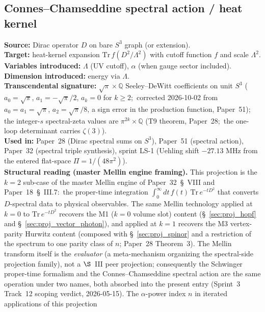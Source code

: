 \documentclass[11pt]{article}
\begin{document}
\subsection{Connes--Chamseddine spectral action / heat kernel}
\label{sec:proj_spectral_action}
\textbf{Source:} Dirac operator $D$ on bare $S^3$ graph (or
extension).\\
\textbf{Target:} heat-kernel expansion
$\mathrm{Tr}\, f(D^2/\Lambda^2)$ with cutoff function $f$ and scale
$\Lambda^2$.\\
\textbf{Variables introduced:} $\Lambda$ (UV cutoff), $\alpha$ (when
gauge sector included).\\
\textbf{Dimension introduced:} energy via $\Lambda$.\\
\textbf{Transcendental signature:} $\sqrt{\pi} \times \mathbb{Q}$
Seeley--DeWitt coefficients on unit $S^3$ ($a_0 = \sqrt{\pi}$,
$a_1 = -\sqrt{\pi}/2$, $a_k = 0$ for $k \ge 2$;\ corrected 2026-10-02
from $a_0 = a_1 = \sqrt{\pi}$, $a_2 = \sqrt{\pi}/8$, a sign error in the
production function, Paper~51); the integer-$s$ spectral-zeta values are
$\pi^{2k} \times \mathbb{Q}$ (T9 theorem, Paper~28;\ the one-loop
determinant carries $\zeta(3)$).\\
\textbf{Used in:} Paper~28 (Dirac spectral sums on $S^3$), Paper~51
(spectral action), Paper~32 (spectral triple synthesis), sprint LS-1 (Uehling shift $-27.13$ MHz from the entered
flat-space $\Pi = 1/(48\pi^2)$).\\
\textbf{Structural reading (master Mellin engine framing).}  This
projection is the $k=2$ sub-case of the master Mellin engine of
Paper~32~\S~VIII and Paper~18~\S~III.7:\ the proper-time integration
$\int_0^\infty dt\, f(t)\,\mathrm{Tr}\,e^{-tD^2}$ that converts $D$-spectral
data to physical observables.  The same Mellin technology applied
at $k=0$ to $\mathrm{Tr}\,e^{-tD^2}$ recovers the M1 ($k = 0$ volume slot)
content (\S~\ref{sec:proj_hopf} and \S~\ref{sec:proj_vector_photon}),
and applied at $k=1$ recovers the M3 vertex-parity Hurwitz content
(composed with \S~\ref{sec:proj_spinor} and a restriction of the
spectrum to one parity class of $n$; Paper~28 Theorem~3).  The Mellin transform itself is the
\emph{evaluator} (a meta-mechanism organizing the spectral-side
projection family), not a $\S$~III peer projection; consequently the
Schwinger proper-time formalism and the Connes--Chamseddine spectral
action are the same operation under two names, both absorbed into the
present entry (Sprint~3 Track~12 scoping verdict, 2026-05-15).
The $\alpha$-power index $n$ in iterated applications of this projection
\end{document}
